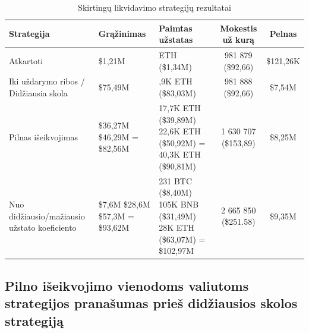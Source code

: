 \documentclass[]{VUMIFTemplateClass}
\begin{document}
\begin{table}[h!]
  \centering
  \caption{Skirtingų likvidavimo strategijų rezultatai}
  \begin{tabular}{|>{\raggedright\arraybackslash}m{3.5cm}|>{\centering\arraybackslash}p{2cm}|>{\centering\arraybackslash}p{4cm}|c|c|}
  \hline
  \textbf{Strategija} & \textbf{Grąžinimas} & \textbf{Paimtas užstatas} & \textbf{Mokestis už kurą} & \textbf{Pelnas} \\ \hline
  Atkartoti                                    & \$1,21M   & 594 ETH (\$1,34M)     & 981 879 (\$92,66)    & \$121,26K \\ \hline
  Iki uždarymo ribos / Didžiausia skola        & \$75,49M & 36,9K ETH (\$83,03M) & 981 888 (\$92,66)    & \$7,54M   \\ \hline
  Pilnas išeikvojimas                & \makecell[c]{\$36,27M \\ \$46,29M \\ = \$82,56M}  & \makecell[c]{17,7K ETH (\$39,89M) \\ 22,6K ETH (\$50,92M) \\ = 40,3K ETH (\$90,81M)}  & 1 630 707 (\$153,89) & \$8,25M   \\ \hline
  Nuo didžiausio/mažiausio užstato koeficiento & \makecell[c]{\$7,6M \\ \$28,6M \\ \$57,3M \\ = \$93,62M}  &  \makecell[c]{231 BTC (\$8,40M) \\ 105K BNB (\$31,49M) \\ 28K ETH (\$63,07M) \\ = \$102,97M}    & 2 665 850 (\$251.58)   & \$9,35M   \\ \hline
  \end{tabular}
  \label{liquidation_example_comp}
  \end{table}

\subsection{Pilno išeikvojimo vienodoms valiutoms strategijos pranašumas prieš didžiausios skolos strategiją}
\label{sec:pilnas_iseikvojimas_vienodoms_valiutoms_tyrimas}
\end{document}
